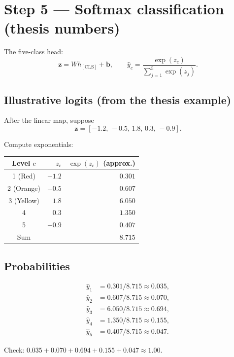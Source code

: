 \section{Step 5 --- Softmax classification (thesis numbers)}
\label{sec:softmax}

The five-class head:
\[
  \mathbf{z} = W h_{\mathrm{[CLS]}} + \mathbf{b},
  \qquad
  \hat{y}_c = \frac{\exp(z_c)}{\sum_{j=1}^{5}\exp(z_j)}.
\]

\subsection*{Illustrative logits (from the thesis example)}

After the linear map, suppose
\[
  \mathbf{z} = [-1.2,\,-0.5,\,1.8,\,0.3,\,-0.9].
\]

Compute exponentials:

\begin{center}
\begin{tabular}{@{}crr@{}}
\toprule
Level \(c\) & \(z_c\) & \(\exp(z_c)\) (approx.) \\
\midrule
1 (Red) & \(-1.2\) & \(0.301\) \\
2 (Orange) & \(-0.5\) & \(0.607\) \\
3 (Yellow) & \(1.8\) & \(6.050\) \\
4 & \(0.3\) & \(1.350\) \\
5 & \(-0.9\) & \(0.407\) \\
\midrule
Sum & & \(8.715\) \\
\bottomrule
\end{tabular}
\end{center}

\subsection*{Probabilities}

\[
\begin{aligned}
  \hat{y}_1 &= 0.301/8.715 \approx 0.035, \\
  \hat{y}_2 &= 0.607/8.715 \approx 0.070, \\
  \hat{y}_3 &= 6.050/8.715 \approx 0.694, \\
  \hat{y}_4 &= 1.350/8.715 \approx 0.155, \\
  \hat{y}_5 &= 0.407/8.715 \approx 0.047.
\end{aligned}
\]

Check: \(0.035+0.070+0.694+0.155+0.047 \approx 1.00\).

